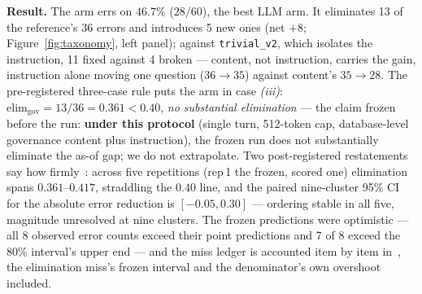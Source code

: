 \smallskip\noindent{}\textbf{Result.} The arm errs on $46.7\%$ ($28/60$), the
best LLM arm. It eliminates 13 of the reference's 36 errors and introduces 5
new ones (net $+8$; Figure~\ref{fig:taxonomy}, left panel); against
\texttt{trivial\_v2}, which isolates the
instruction, 11 fixed against 4 broken --- content, not instruction, carries
the gain, instruction alone moving one question ($36\to35$) against
content's
$35\to28$. The pre-registered three-case rule puts the arm in
case \emph{(iii)}: $\mathrm{elim}_{\mathrm{gov}}=13/36=0.361<0.40$, \emph{no
substantial elimination} --- the claim frozen before the run:
\textbf{under this protocol} (single turn, 512-token cap, database-level governance content plus
instruction), the frozen run does not substantially eliminate the
as-of gap; we do not extrapolate. Two post-registered restatements say how
firmly~\cite{asofgov-tr}: across five repetitions (rep\,1 the
frozen, scored one) elimination spans $0.361$--$0.417$, straddling the
$0.40$ line, and the paired nine-cluster 95\% CI for the
absolute error reduction is $[-0.05,0.30]$ --- ordering stable in all
five, magnitude unresolved at nine clusters. The frozen predictions were
optimistic --- all 8 observed error counts
exceed their point predictions and 7 of 8 exceed the 80\% interval's upper
end --- and the miss ledger is accounted item by item
in~\cite{asofgov-tr}, the elimination miss's frozen interval and the
denominator's own overshoot included.

